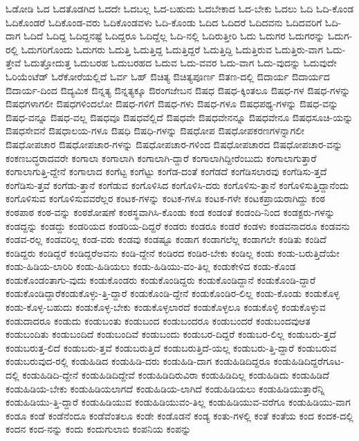 {ಓಡೋಡಿ
ಓದ
ಓದತೊಡಗಿದ
ಓದದೇ
ಓದಬಲ್ಲ
ಓದ-ಬಹುದು
ಓದಬೇಕಾದ
ಓದ-ಬೇಕು
ಓದಲು
ಓದಿ
ಓದಿ-ಕೊಂಡ
ಓದಿಕೊಂಡರೆ
ಓದಿಕೊಂಡ-ವರು
ಓದಿಕೊಂಡವಳು
ಓದಿ-ಕೊಂಡು
ಓದಿದ
ಓದಿದರೆ
ಓದಿದವನು
ಓದಿದವರಿಗೆ
ಓದಿ-ದಾಗ
ಓದಿದೆ
ಓದಿದ್ದ
ಓದಿದ್ದನಷ್ಟೆ
ಓದಿದ್ದರೂ
ಓದಿದ್ದೆಲ್ಲ
ಓದಿ-ನಲ್ಲಿ
ಓದಿರುತ್ತೀರಿ
ಓದು
ಓದುಗರ
ಓದುಗರನ್ನು
ಓದುಗ-ರಲ್ಲಿ
ಓದುಗರಿಗೊಂದು
ಓದುಗರು
ಓದುತ್ತಿ
ಓದುತ್ತಿದ್ದ
ಓದುತ್ತಿದ್ದರೆ
ಓದುತ್ತಿದ್ದಿ
ಓದುತ್ತಿರುವ
ಓದುತ್ತಿರು-ವಾಗ
ಓದು-ತ್ತೇವೆ
ಓದುತ್ತೋದುತ್ತ
ಓದುಬರಹ
ಓದುಬರಹದ
ಓದುವ
ಓದು-ವವರ
ಓದು-ವಾಗ
ಓದು-ವುದನ್ನು
ಓದುವುದೇ
ಓರಿಯೆಂಟೆಡ್
ಓರೆಕೋರೆಯಲ್ಲಿದೆ
ಓರ್ವ
ಓಹ್
ಔಚಿತ್ಯ
ಔಚಿತ್ಯಪೂರ್ಣ
ಔತಣ-ದಲ್ಲಿ
ಔದಾರ್ಯ
ಔದಾರ್ಯದ
ಔದಾರ್ಯ-ದಿಂದ
ಔದ್ಯಮಿಕ
ಔನ್ನತ್ಯ
ಔನ್ನತ್ಯಕ್ಕೂ
ಔರಂಗಜೇಬನ
ಔಷಧ
ಔಷಧ-ಕ್ಕಿಂತಲೂ
ಔಷಧ-ಗಳ
ಔಷಧ-ಗಳನ್ನು
ಔಷಧಗಳಾಗಲೀ
ಔಷಧಗಳಿಂದಲೋ
ಔಷಧ-ಗಳಿಗೆ
ಔಷಧ-ಗಳು
ಔಷಧ-ಗಳೂ
ಔಷಧಪಥ್ಯ-ಗಳನ್ನು
ಔಷಧ-ವನ್ನು
ಔಷಧ-ವನ್ನೂ
ಔಷಧ-ವಲ್ಲ
ಔಷಧವೂ
ಔಷಧವೆಲ್ಲಿದೆ
ಔಷಧವೇ
ಔಷಧವೇನನ್ನೂ
ಔಷಧವೇನೂ
ಔಷಧಸೂಚಿ-ಯನ್ನು
ಔಷಧಸೇವನೆ
ಔಷಧಾಲಯ-ಗಳೂ
ಔಷಧಿ
ಔಷಧಿ-ಗಳನ್ನು
ಔಷಧೋಪ
ಔಷಧೋಪಕರಣಗಳನ್ನಾಗಲೀ
ಔಷಧೋಪಚಾರ
ಔಷಧೋಪಚಾರ-ಗಳನ್ನು
ಔಷಧೋಪಚಾರ-ಗಳಿಂದ
ಔಷಧೋಪಚಾರದ
ಔಷಧೋಪಚಾರ-ವನ್ನು
ಕಂಕಣಬದ್ಧರಾದವರೇ
ಕಂಗಾಲಾ
ಕಂಗಾಲಾಗಿ
ಕಂಗಾಲಾಗಿ-ದ್ದಾರೆ
ಕಂಗಾಲಾಗಿದ್ದೀರೆಂಬುದು
ಕಂಗಾಲಾಗುತ್ತಾರೆ
ಕಂಗಾಲಾಗುತ್ತಿ-ದ್ದೇನೆ
ಕಂಗಾಲಾದ
ಕಂಗೆಟ್ಟ
ಕಂಗೆಟ್ಟು
ಕಂಗೆಡ-ದಂತೆ
ಕಂಗೆಡದೆ
ಕಂಗೆಡಿಸಲಾರವು
ಕಂಗೆಡಿಸು-ತ್ತದೆ
ಕಂಗೆಡಿಸು-ತ್ತವೆ
ಕಂಗೆಡು-ತ್ತಾನೆ
ಕಂಗೆಡುವ
ಕಂಗೊಳಿಸಿದ
ಕಂಗೊಳಿಸಿ-ದರು
ಕಂಗೊಳಿಸು-ತ್ತಾನೆ
ಕಂಗೊಳಿಸುತ್ತಿದ್ದಾನೆಂದು
ಕಂಗೊಳಿಸುವ
ಕಂಗೊಳಿಸುವವರೆಲ್ಲರ
ಕಂಟಕ-ಗಳನ್ನು
ಕಂಟಕ-ಗಳೂ
ಕಂಟಕ-ಗಳೇ
ಕಂಟಕಪ್ರಾಯರಾಗಿದ್ದು
ಕಂಠ
ಕಂಠಪಾಠ
ಕಂಠ-ವನ್ನು
ಕಂಠಶೋಷಣೆ
ಕಂಠಸ್ಥವಾಗಿಸಿ-ಕೊಂಡು
ಕಂಡ
ಕಂಡಂತೆ
ಕಂಡಂದಿ-ನಿಂದ
ಕಂಡಕ್ಟರು-ಗಳನ್ನು
ಕಂಡದ್ದನ್ನು
ಕಂಡದ್ದು
ಕಂಡರಿಯದ
ಕಂಡರಿಯ-ದಿದ್ದರೆ
ಕಂಡರು
ಕಂಡರೂ
ಕಂಡರೆ
ಕಂಡಳು
ಕಂಡವನಾದರೂ
ಕಂಡವನು
ಕಂಡವ-ರಲ್ಲ
ಕಂಡವರಿಲ್ಲ
ಕಂಡ-ವರು
ಕಂಡವು
ಕಂಡಷ್ಟೂ
ಕಂಡಾಗ
ಕಂಡಾಗಲೆಲ್ಲ
ಕಂಡಾಗಲೇ
ಕಂಡಿತು
ಕಂಡಿದೆ
ಕಂಡಿದ್ದರು
ಕಂಡಿದ್ದರೆ
ಕಂಡಿದ್ದರೆಅವನು
ಕಂಡಿ-ದ್ದೇನೆ
ಕಂಡಿರದ
ಕಂಡಿರ-ಬೇಕು
ಕಂಡಿಲ್ಲ
ಕಂಡು
ಕಂಡು-ಬರುತ್ತಿದೆಯೇ
ಕಂಡು-ಹಿಡಿಯ-ಲಾರಿರಿ
ಕಂಡು-ಹಿಡಿಯಲು
ಕಂಡು-ಹಿಡಿಯು-ವಂ-ತಿಲ್ಲ
ಕಂಡುಕೇಳಿದ
ಕಂಡು-ಕೊಂಡ
ಕಂಡುಕೊಂಡಂತಾಗು-ವುದು
ಕಂಡುಕೊಂಡರು
ಕಂಡುಕೊಂಡಿದ್ದರು
ಕಂಡುಕೊಂಡಿದ್ದಾನೆ
ಕಂಡುಕೊಂಡಿ-ದ್ದಾರೆ
ಕಂಡುಕೊಂಡಿದ್ದಾರೆಕಂಡುಕೊಳ್ಳು-ತ್ತಿ-ದ್ದಾರೆ
ಕಂಡುಕೊಂಡಿ-ದ್ದೇನೆ
ಕಂಡುಕೊಂಡಿರ-ಲಿಲ್ಲ
ಕಂಡು-ಕೊಂಡು
ಕಂಡುಕೊಳ್ಳ
ಕಂಡು-ಕೊಳ್ಳ-ಬಹುದು
ಕಂಡುಕೊಳ್ಳ-ಬೇಕು
ಕಂಡುಕೊಳ್ಳಲಾರದೆ
ಕಂಡುಕೊಳ್ಳಲೂ
ಕಂಡುಕೊಳ್ಳಿ
ಕಂಡುಕೊಳ್ಳುವ
ಕಂಡುದಾದರೂ
ಕಂಡುದು
ಕಂಡುಬಂತು
ಕಂಡುಬಂದ
ಕಂಡುಬಂದರೂ
ಕಂಡುಬಂದರೆ
ಕಂಡುಬಂದವುಆತ
ಕಂಡುಬಂದಿತು
ಕಂಡುಬಂದಿದೆ
ಕಂಡುಬಂದಿವೆ
ಕಂಡುಬಂದು
ಕಂಡುಬರ-ದಿದ್ದರೆ
ಕಂಡುಬರ-ಲಿಲ್ಲ
ಕಂಡುಬರು-ತ್ತದೆ
ಕಂಡುಬರುತ್ತ-ಲಿದೆ
ಕಂಡುಬರು-ತ್ತವೆ
ಕಂಡುಬರುತ್ತಿದೆ
ಕಂಡುಬರುತ್ತಿದೆ-ಯಲ್ಲ
ಕಂಡುಬರು-ತ್ತಿ-ದ್ದಾರೆ
ಕಂಡುಬರುವ
ಕಂಡುಬರುವುದ-ರಲ್ಲಿ
ಕಂಡುಹಿಡಿದ
ಕಂಡುಹಿಡಿ-ದರು
ಕಂಡುಹಿಡಿ-ದಾಗ
ಕಂಡುಹಿಡಿದಿದ್ದರೂ
ಕಂಡುಹಿಡಿದಿದ್ದರೆಗೂಟ-ದಲ್ಲಿ
ಕಂಡುಹಿಡಿದಿ-ದ್ದೇನೆ
ಕಂಡುಹಿಡಿದಿದ್ದೇವೆ
ಕಂಡುಹಿಡಿದಿರುವಿರಾ
ಕಂಡುಹಿಡಿದಿಲ್ಲ
ಕಂಡುಹಿಡಿದು
ಕಂಡುಹಿಡಿದೆ
ಕಂಡುಹಿಡಿಯ-ಬೇಕು
ಕಂಡುಹಿಡಿಯಲಾಗದೆ
ಕಂಡುಹಿಡಿಯ-ಲಾಗಿದೆ
ಕಂಡುಹಿಡಿಯಲು
ಕಂಡುಹಿಡಿಯುತ್ತಾರೆನ್ನಿ
ಕಂಡುಹಿಡಿಯು-ತ್ತಿ-ದ್ದಾರೆ
ಕಂಡುಹಿಡಿಯುವ
ಕಂಡುಹಿಡಿಯುವಂ-ತಿಲ್ಲ
ಕಂಡುಹಿಡಿಯುವ-ವರೆಗೂ
ಕಂಡುಹಿಡಿಯು-ವಾಗ
ಕಂಡೂ
ಕಂಡೆ
ಕಂಡೆನೆಂದೂ
ಕಂಡೆವೆಂತಲೂ
ಕಂಡೇ
ಕಂಡೊಡನೆ
ಕಂಡ್ಯ
ಕಂತು-ಗಳಲ್ಲಿ
ಕಂತೆ
ಕಂತೆಯ
ಕಂದ
ಕಂದಕ-ದಲ್ಲಿ
ಕಂದನ
ಕಂದ-ನನ್ನು
ಕಂದು
ಕಂದುಗುಲಾಬಿ
ಕಂಪನಿಯ
ಕಂಪನ್ನು
}
